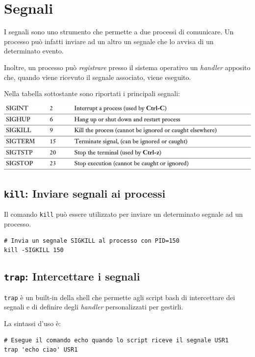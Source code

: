 \documentclass[a4paper]{report}
\newenvironment{code}{\begin{tcolorbox}[size=small]}{\end{tcolorbox}}
\begin{document}
\section{Segnali}

I segnali sono uno strumento che permette a due processi di comunicare. Un processo può infatti inviare ad un altro un segnale che lo avvisa di un determinato evento.

Inoltre, un processo può \textit{registrare} presso il sistema operativo un \textit{handler} apposito che, quando viene ricevuto il segnale associato, viene eseguito.

Nella tabella sottostante sono riportati i principali segnali:

\begin{center}
	\includegraphics[width=0.8\linewidth]{signals}
\end{center}

\subsection{\texttt{kill}: Inviare segnali ai processi}

Il comando \texttt{kill} può essere utilizzato per inviare un determinato segnale ad un processo.

\begin{code} 
\begin{lstlisting}
# Invia un segnale SIGKILL al processo con PID=150
kill -SIGKILL 150
\end{lstlisting}
\end{code}

\subsection{\texttt{trap}: Intercettare i segnali}

\texttt{trap} è un built-in della shell che permette agli script bash di intercettare dei segnali e di definire degli \textit{handler} personalizzati per gestirli.

La sintassi d'uso è:
\begin{code} 
\begin{lstlisting}
# Esegue il comando echo quando lo script riceve il segnale USR1
trap 'echo ciao' USR1
\end{lstlisting}
\end{code}
\end{document}
